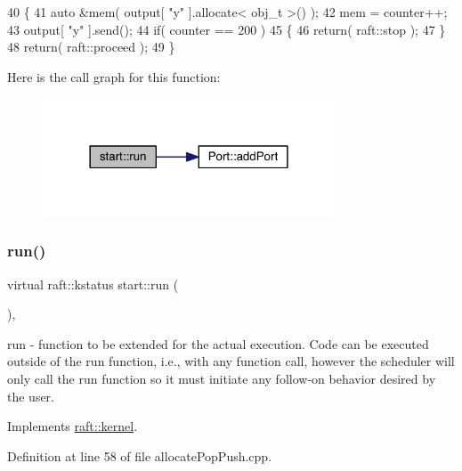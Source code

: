\begin{DoxyCode}
40     \{
41         \textcolor{keyword}{auto} &mem( output[ \textcolor{stringliteral}{"y"} ].allocate< obj\_t >() );
42         mem = counter++;
43         output[ \textcolor{stringliteral}{"y"} ].send();
44         \textcolor{keywordflow}{if}( counter == 200 )
45         \{
46             \textcolor{keywordflow}{return}( raft::stop );
47         \}
48         \textcolor{keywordflow}{return}( raft::proceed );
49     \}
\end{DoxyCode}
Here is the call graph for this function\+:
\nopagebreak
\begin{figure}[H]
\begin{center}
\leavevmode
\includegraphics[width=246pt]{classstart_a4c076d756e2846f51e54452853a9ed6d_cgraph}
\end{center}
\end{figure}
\hypertarget{classstart_a4c076d756e2846f51e54452853a9ed6d}{}\label{classstart_a4c076d756e2846f51e54452853a9ed6d} 
\subsubsection{\texorpdfstring{run()}{run()}\hspace{0.1cm}{\footnotesize\ttfamily [2/6]}}
{\footnotesize\ttfamily virtual raft\+::kstatus start\+::run (\begin{DoxyParamCaption}{ }\end{DoxyParamCaption})\hspace{0.3cm}{\ttfamily [inline]}, {\ttfamily [virtual]}}

run -\/ function to be extended for the actual execution. Code can be executed outside of the run function, i.\+e., with any function call, however the scheduler will only call the run function so it must initiate any follow-\/on behavior desired by the user. 

Implements \hyperlink{classraft_1_1kernel_a05094286d7577360fb1b91c91fc05901}{raft\+::kernel}.



Definition at line 58 of file allocate\+Pop\+Push.\+cpp.



